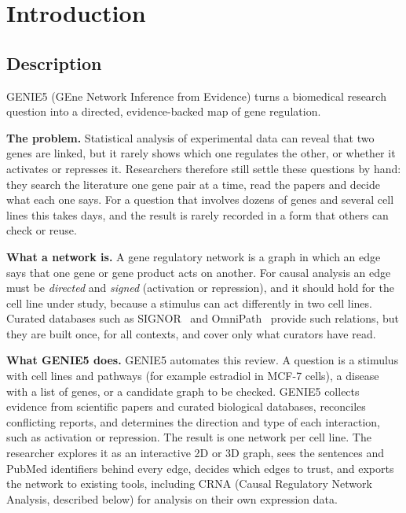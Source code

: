 \documentclass[11pt,a4paper]{article}
\newcommand{\gen}{GENIE5}
\begin{document}
\section{Introduction}

\subsection{Description}

\gen{} (GEne Network Inference from Evidence) turns a biomedical research question into a
directed, evidence-backed map of gene regulation.

\textbf{The problem.} Statistical analysis of experimental data can reveal that two genes are
linked, but it rarely shows which one regulates the other, or whether it activates or represses
it. Researchers therefore still settle these questions by hand: they search the literature one
gene pair at a time, read the papers and decide what each one says. For a question that involves
dozens of genes and several cell lines this takes days, and the result is rarely recorded in a
form that others can check or reuse.

\textbf{What a network is.} A gene regulatory network is a graph in which an edge says that one gene or gene product acts on
another. For causal analysis an edge must be \emph{directed} and \emph{signed} (activation or
repression), and it should hold for the cell line under study, because a stimulus can act
differently in two cell lines. Curated databases such as SIGNOR~\cite{signor} and
OmniPath~\cite{omnipath} provide such relations, but they are built once, for all contexts, and
cover only what curators have read.

\textbf{What \gen{} does.} \gen{} automates this review. A question is a stimulus with cell lines
and pathways (for example estradiol in MCF-7 cells), a disease with a list of genes, or a
candidate graph to be checked. \gen{} collects evidence from scientific papers and curated
biological databases, reconciles conflicting reports, and determines the direction and type of
each interaction, such as activation or repression. The result is one network per cell line. The
researcher explores it as an interactive 2D or 3D graph, sees the sentences and PubMed
identifiers behind every edge, decides which edges to trust, and exports the network to existing
tools, including CRNA (Causal Regulatory Network Analysis, described below) for analysis on
their own expression data.
\end{document}
